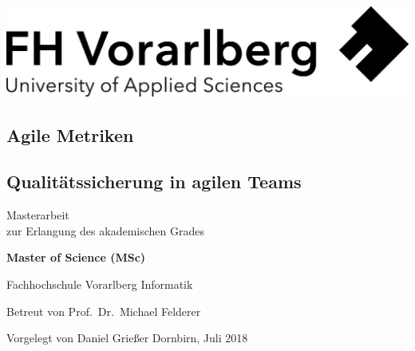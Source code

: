 \documentclass[a4paper,12pt,twoside]{scrreprt}
\begin{document}

\cleardoublepage{}
\thispagestyle{empty}
\begin{titlepage}
  \begin{flushright}
  \includegraphics[width=0.4\linewidth]{Logo-A3}
  \end{flushright}
  \begin{flushleft}
  \section*{Agile Metriken}
  \subsection*{Qualitätssicherung in agilen Teams}
  \vspace{1.5cm}
  
  Masterarbeit\\
  zur Erlangung des akademischen Grades
  \vspace{0.5cm}
  
  \textbf{Master of Science (MSc)}

  \vspace{2cm}
  Fachhochschule Vorarlberg\newline
  Informatik

  \vspace{1cm}
  
  Betreut von\newline
  Prof.\ Dr.\ Michael Felderer
  
  \vspace{2cm}
  
  Vorgelegt von\newline
  Daniel Grießer\newline
  Dornbirn, Juli 2018
  \end{flushleft}
\end{titlepage}




\cleardoublepage\tableofcontents

\clearpage
{}
\listoffigures

\clearpage
{}
\listoftables
\end{document}
